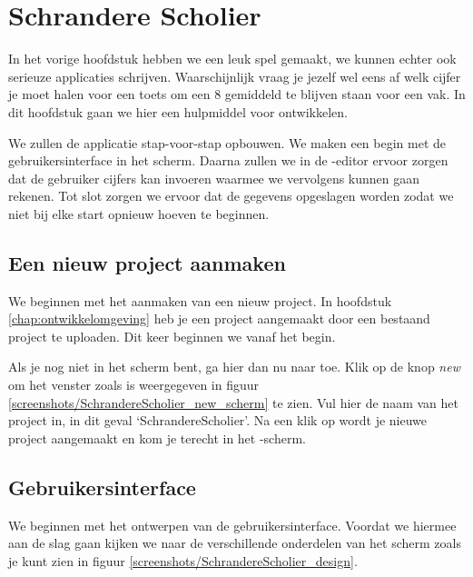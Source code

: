 \chapter{Schrandere Scholier}

In het vorige hoofdstuk hebben we een leuk spel gemaakt, we kunnen echter ook serieuze applicaties schrijven. Waarschijnlijk vraag je jezelf wel eens af welk cijfer je moet halen voor een toets om een 8 gemiddeld te blijven staan voor een vak. In dit hoofdstuk gaan we hier een hulpmiddel voor ontwikkelen.

We zullen de applicatie stap-voor-stap opbouwen. We maken een begin met de gebruikersinterface in het  scherm. Daarna zullen we in de -editor ervoor zorgen dat de gebruiker cijfers kan invoeren waarmee we vervolgens kunnen gaan rekenen. Tot slot zorgen we ervoor dat de gegevens opgeslagen worden zodat we niet bij elke start opnieuw hoeven te beginnen.

\section{Een nieuw project aanmaken}
We beginnen met het aanmaken van een nieuw project. In hoofdstuk \ref{chap:ontwikkelomgeving} heb je een project aangemaakt door een bestaand project te uploaden. Dit keer beginnen we vanaf het begin. 

Als je nog niet in het  scherm bent, ga hier dan nu naar toe. Klik op de knop \emph{new} om het venster zoals is weergegeven in figuur \ref{screenshots/SchrandereScholier_new_scherm} te zien. Vul hier de naam van het project in, in dit geval `SchrandereScholier'. Na een klik op  wordt je nieuwe project aangemaakt en kom je terecht in het -scherm.

\section{Gebruikersinterface}
We beginnen met het ontwerpen van de gebruikersinterface. Voordat we hiermee aan de slag gaan kijken we naar de verschillende onderdelen van het scherm zoals je kunt zien in figuur \ref{screenshots/SchrandereScholier_design}.


